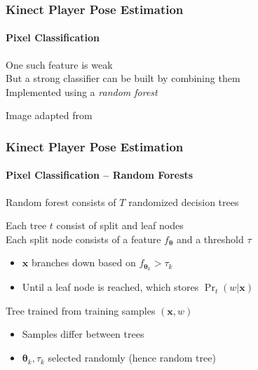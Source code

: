 \documentclass[xetex,professionalfont]{beamer}
\renewcommand{\vec}[1]{\ensuremath{\mathbf{#1}}}
\newcommand{\vx}{\vec{x}}
\newcommand{\bth}{\boldsymbol{\theta}}
\begin{document}

\begin{frame}
\frametitle{Kinect Player Pose Estimation}
\framesubtitle{Pixel Classification}

One such feature is weak\\\medskip
But a strong classifier can be built by combining them\\\medskip 
Implemented using a \emph{random forest} %

\bigskip
\begin{center}
    {\centering Image adapted from \cite{shotton2011}}
\end{center}

\end{frame}


\begin{frame}
\frametitle{Kinect Player Pose Estimation}
\framesubtitle{Pixel Classification -- Random Forests}

Random forest consists of $T$ randomized decision trees

\bigskip
Each tree $t$ consist of split and leaf nodes\\\medskip
Each split node consists of a feature $f_{\bth}$ and a threshold $\tau$
\begin{itemize}
    \item $\vx$ branches down based on $f_{\bth_k}>\tau_k$
    \item Until a leaf node is reached, which stores $\Pr_t(w|\vx)$
\end{itemize}

\bigskip
Tree trained from training samples $(\vx,w)$ %
\begin{itemize}
    \item Samples differ between trees
    \item $\bth_k,\tau_k$ selected randomly (hence random tree) %
\end{itemize}

\end{frame}
\end{document}
